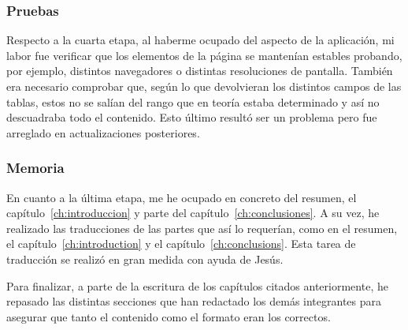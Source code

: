 \subsubsection{Pruebas}
Respecto a la cuarta etapa, al haberme ocupado del aspecto de la aplicación, mi labor fue verificar que los elementos de la página se mantenían estables probando, por ejemplo, distintos navegadores o distintas resoluciones de pantalla. También era necesario comprobar que, según lo que devolvieran los distintos campos  de las tablas, estos no se salían del rango que en teoría estaba determinado y así no descuadraba todo el contenido. Esto último resultó ser un problema pero fue arreglado en actualizaciones posteriores.
\subsubsection{Memoria}
En cuanto a la última etapa, me he ocupado en concreto del resumen, el capítulo~\ref{ch:introduccion} y parte del capítulo~\ref{ch:conclusiones}. A su vez, he realizado las traducciones de las partes que así lo requerían, como en el resumen, el capítulo~\ref{ch:introduction} y el capítulo~\ref{ch:conclusions}. Esta tarea de traducción se realizó en gran medida con ayuda de Jesús.\par
Para finalizar, a parte de la escritura de los capítulos citados anteriormente, he repasado las distintas secciones que han redactado los demás integrantes para asegurar que tanto el contenido como el formato eran los correctos.

\noindent
